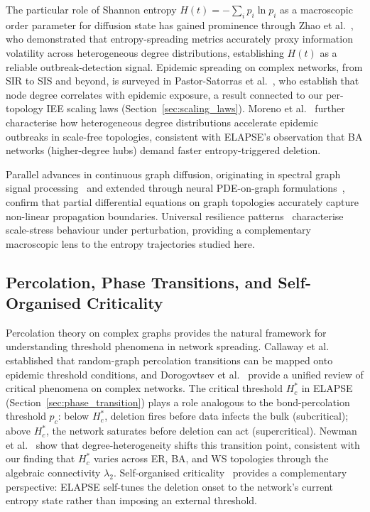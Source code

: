 \documentclass[review,12pt]{elsarticle}
\newcommand{\Hc}{H_c}
\begin{document}
The particular role of Shannon entropy $H(t) = -\sum_i p_i \ln p_i$ as a
macroscopic order parameter for diffusion state has gained prominence through
Zhao et al.~\cite{zhao2024multi}, who demonstrated that entropy-spreading
metrics accurately proxy information volatility across heterogeneous degree
distributions, establishing $H(t)$ as a reliable outbreak-detection signal.
Epidemic spreading on complex networks, from SIR to SIS and beyond,
is surveyed in Pastor-Satorras et al.~\cite{pastor2015epidemic}, who
establish that node degree correlates with epidemic exposure, a result
connected to our per-topology IEE scaling laws (Section~\ref{sec:scaling_laws}).
Moreno et al.~\cite{moreno2002epidemic} further characterise how heterogeneous
degree distributions accelerate epidemic outbreaks in scale-free topologies,
consistent with ELAPSE's observation that BA networks (higher-degree hubs)
demand faster entropy-triggered deletion.

Parallel advances in continuous graph diffusion, originating in spectral graph
signal processing~\cite{shuman2013emerging} and extended through neural
PDE-on-graph formulations~\cite{chamberlain2021grand,eliasof2024graph,fan2024graph},
confirm that partial differential equations on graph topologies accurately
capture non-linear propagation boundaries.  Universal resilience
patterns~\cite{gao2016universal} characterise scale-stress behaviour under
perturbation, providing a complementary macroscopic lens to the entropy
trajectories studied here.

\subsection{Percolation, Phase Transitions, and Self-Organised Criticality}

Percolation theory on complex graphs provides the natural framework for
understanding threshold phenomena in network spreading.
Callaway et al.~\cite{callaway2000network} established that random-graph
percolation transitions can be mapped onto epidemic threshold conditions,
and Dorogovtsev et al.~\cite{dorogovtsev2008critical} provide a unified
review of critical phenomena on complex networks.  The critical threshold
$\Hc^*$ in ELAPSE (Section~\ref{sec:phase_transition}) plays a role
analogous to the bond-percolation threshold $p_c$: below $\Hc^*$, deletion
fires before data infects the bulk (subcritical); above $\Hc^*$, the
network saturates before deletion can act (supercritical).
Newman et al.~\cite{newman2001random} show that degree-heterogeneity
shifts this transition point, consistent with our finding that $\Hc^*$
varies across ER, BA, and WS topologies through the algebraic connectivity
$\lambda_2$.  Self-organised criticality~\cite{vespignani2012modelling}
provides a complementary perspective: ELAPSE self-tunes the deletion onset
to the network's current entropy state rather than imposing an external
threshold.
\end{document}
